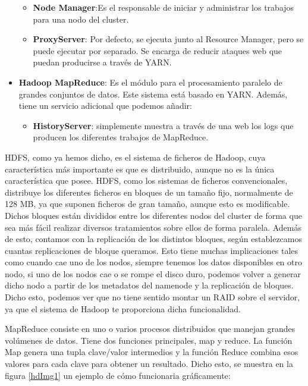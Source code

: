 \begin{itemize}
\begin{itemize}
		\item \textbf{Node Manager}:Es el responsable de iniciar y administrar los trabajos para una nodo del cluster.
		\item \textbf{ProxyServer}: Por defecto, se ejecuta junto al Resource Manager, pero se puede ejecutar por separado. Se encarga de reducir ataques web que puedan producirse a través de YARN.
	\end{itemize}
	\item \textbf{Hadoop MapReduce}: Es el módulo para el procesamiento paralelo de grandes conjuntos de datos. Este sistema está basado en YARN. Además, tiene un servicio adicional que podemos añadir: 
	\begin{itemize}
		\item \textbf{HistoryServer}: simplemente muestra a través de una web los logs que producen los diferentes trabajos de MapReduce.
	\end{itemize}
\end{itemize}

HDFS, como ya hemos dicho, es el sistema de ficheros de Hadoop, cuya característica más importante es que es distribuido, aunque no es la única característica que posee. HDFS, como los sistemas de ficheros convencionales, distribuye los diferentes ficheros en bloques de un tamaño fijo, normalmente de 128 MB, ya que suponen ficheros de gran tamaño, aunque esto es modificable. Dichos bloques están divididos entre los diferentes nodos del cluster de forma que sea más fácil realizar diversos tratamientos sobre ellos de forma paralela. Además de esto, contamos con la replicación de los distintos bloques, según establezcamos cuantas replicaciones de bloque queramos. Esto tiene muchas implicaciones tales como cuando cae uno de los nodos, siempre tenemos los datos disponibles en otro nodo, si uno de los nodos cae o se rompe el disco duro, podemos volver a generar dicho nodo a partir de los metadatos del namenode y la replicación de bloques. Dicho esto, podemos ver que no tiene sentido montar un RAID sobre el servidor, ya que el sistema de Hadoop te proporciona dicha funcionalidad.\par

MapReduce consiste en uno o varios procesos distribuidos que manejan grandes volúmenes de datos. Tiene dos funciones principales, map y reduce. La función Map genera una tupla clave/valor intermedios y la función Reduce combina esos valores para cada clave para obtener un resultado. Dicho esto, se muestra en la figura \ref{hdImg1} \cite{Hdp-1} un ejemplo de cómo funcionaria gráficamente:\par

